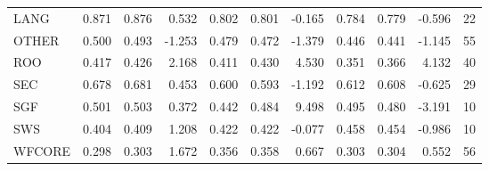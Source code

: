 \begin{tabular}{lrrrrrrrrrr}
LANG      & 0.871 &     0.876 &                0.532 &     0.802 &         0.801 &                   -0.165 &       0.784 &           0.779 &                     -0.596 &     22 \\
OTHER     & 0.500 &     0.493 &               -1.253 &     0.479 &         0.472 &                   -1.379 &       0.446 &           0.441 &                     -1.145 &     55 \\
ROO       & 0.417 &     0.426 &                2.168 &     0.411 &         0.430 &                    4.530 &       0.351 &           0.366 &                      4.132 &     40 \\
SEC       & 0.678 &     0.681 &                0.453 &     0.600 &         0.593 &                   -1.192 &       0.612 &           0.608 &                     -0.625 &     29 \\
SGF       & 0.501 &     0.503 &                0.372 &     0.442 &         0.484 &                    9.498 &       0.495 &           0.480 &                     -3.191 &     10 \\
SWS       & 0.404 &     0.409 &                1.208 &     0.422 &         0.422 &                   -0.077 &       0.458 &           0.454 &                     -0.986 &     10 \\
WFCORE    & 0.298 &     0.303 &                1.672 &     0.356 &         0.358 &                    0.667 &       0.303 &           0.304 &                      0.552 &     56 \\
\bottomrule
\end{tabular}
